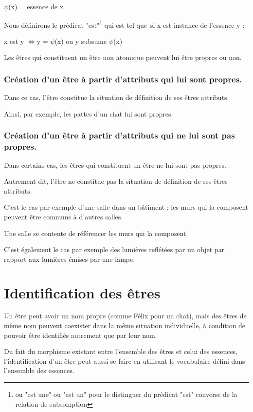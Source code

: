 \documentclass[a4paper, 12pt, openright, french]{book}
\begin{document}
$\psi$(x) = essence de x

Nous définirons le prédicat "est"\footnote{ou "est une" ou "est un" pour le distinguer du prédicat "est" converse de la relation de subsomption} qui est tel que~si
x est instance de l'essence y :

x est y $\Longleftrightarrow$y = $\psi$(x) ou y subsume $\psi$(x)

Les êtres qui constituent un être non atomique peuvent lui être propres ou non.

\subsubsection{Création d'un être à partir d'attributs qui lui sont propres.}
	
Dans ce cas, l'être constitue la situation de définition de ses êtres attributs.

Ainsi, par exemple, les pattes d'un chat lui sont propres.

\subsubsection{Création d'un être à partir d'attributs qui ne lui sont pas propres.}

Dans certains cas, les êtres qui constituent un être ne lui sont pas propres.

Autrement dit, l'être ne constitue pas la situation de définition de ses êtres attributs.

C'est le cas par exemple d'une salle dans un bâtiment : les murs qui la composent peuvent être communs à d'autres salles.

Une salle se contente de référencer les murs qui la composent.

C'est également le cas par exemple des lumières reflétées par un objet par rapport aux lumières émises par une lampe.


\newpage
\section{Identification des êtres}

Un être peut avoir un nom propre (comme Félix pour un chat), mais des
êtres de même nom peuvent coexister dans la même situation individuelle,
à condition de pouvoir être identifiés autrement que par leur nom.

Du fait du morphisme existant entre l'ensemble des êtres
et celui des essences, l'identification d'un être peut aussi se faire en
utilisant le vocabulaire défini dans l'ensemble des
essences.
\end{document}
